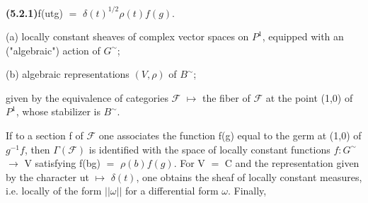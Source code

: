 \documentclass[10pt,a4paper]{article}
\begin{document}
\par\noindent\textbf{(5.2.1)}\quad f(utg) $=$ $\delta{}(t)^{1/2}\rho{}(t)f(g)$.\par
\par\medskip{}\par\smallskip
\par (a) locally constant sheaves of complex vector spaces on $P^1$, equipped with an ("algebraic") action of $G^\sim$;\par
\par (b) algebraic representations $(V,\rho{})$ of $B^\sim$;\par
\par given by the equivalence of categories $\mathcal{F}$ $\mapsto{}$ the fiber of $\mathcal{F}$ at the point (1,0) of $P^1$, whose stabilizer is $B^\sim$.\par
\par If to a section f of $\mathcal{F}$ one associates the function f(g) equal to the germ at (1,0) of $g^{-1}f$, then $\Gamma{}(\mathcal{F})$ is identified with the space of locally constant functions $f:G^\sim$ $\to{}$ V satisfying f(bg) $=$ $\rho{}(b)f(g)$. For V $=$ C and the representation given by the character ut $\mapsto{}$ $\delta{}(t)$, one obtains the sheaf of locally constant measures, i.e. locally of the form $||\omega{}||$ for a differential form $\omega{}$. Finally,\par
\end{document}
